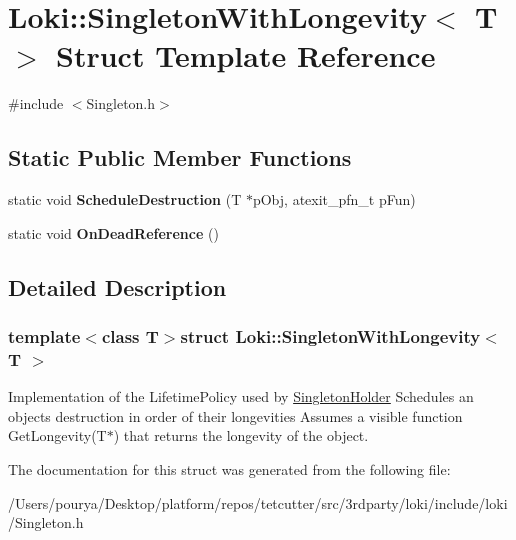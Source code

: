 \hypertarget{classLoki_1_1SingletonWithLongevity}{}\section{Loki\+:\+:Singleton\+With\+Longevity$<$ T $>$ Struct Template Reference}
\label{classLoki_1_1SingletonWithLongevity}


{\ttfamily \#include $<$Singleton.\+h$>$}

\subsection*{Static Public Member Functions}
\begin{DoxyCompactItemize}
\item 
\hypertarget{classLoki_1_1SingletonWithLongevity_a46c377297e8770861cf5592f1681bdb0}{}static void {\bfseries Schedule\+Destruction} (T $\ast$p\+Obj, atexit\+\_\+pfn\+\_\+t p\+Fun)\label{classLoki_1_1SingletonWithLongevity_a46c377297e8770861cf5592f1681bdb0}

\item 
\hypertarget{classLoki_1_1SingletonWithLongevity_aa16692d939cc7ca18ea0dc34ea637ea8}{}static void {\bfseries On\+Dead\+Reference} ()\label{classLoki_1_1SingletonWithLongevity_aa16692d939cc7ca18ea0dc34ea637ea8}

\end{DoxyCompactItemize}


\subsection{Detailed Description}
\subsubsection*{template$<$class T$>$struct Loki\+::\+Singleton\+With\+Longevity$<$ T $>$}

Implementation of the Lifetime\+Policy used by \hyperlink{classLoki_1_1SingletonHolder}{Singleton\+Holder} Schedules an object\textquotesingle{}s destruction in order of their longevities Assumes a visible function Get\+Longevity(\+T$\ast$) that returns the longevity of the object. 

The documentation for this struct was generated from the following file\+:\begin{DoxyCompactItemize}
\item 
/\+Users/pourya/\+Desktop/platform/repos/tetcutter/src/3rdparty/loki/include/loki/Singleton.\+h\end{DoxyCompactItemize}
